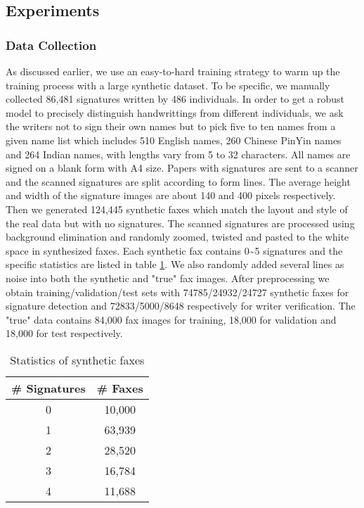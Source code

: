 \documentclass[sigconf]{acmart}
\begin{document}
\subsection{Experiments}

\subsubsection*{\rm \textbf{Data Collection}}
As discussed earlier, we use an easy-to-hard training strategy to warm up the training process with a large synthetic dataset. To be specific, we manually collected 86,481 signatures written by 486 individuals. In order to get a robust model to precisely distinguish handwrittings from different individuals, we ask the writers not to sign their own names but to pick five to ten names from a given name list which includes 510 English names, 260 Chinese PinYin names and 264 Indian names, with lengths vary from 5 to 32 characters. All names are signed on a blank form with A4 size. Papers with signatures are sent to a scanner and the scanned signatures are split according to form lines. The average height and width of the signature images are about 140 and 400 pixels respectively. Then we generated 124,445 synthetic faxes which match the layout and style of the real data but with no signatures. The scanned signatures are processed using background elimination and randomly zoomed, twisted and pasted to the white space in synthesized faxes. Each synthetic fax contains 0\textasciitilde5 signatures and the specific statistics are listed in table \ref{stat sig}. We also randomly added several lines as noise into both the synthetic and "true" fax images. After preprocessing we obtain training/validation/test sets with 74785/24932/24727 synthetic faxes for signature detection and 72833/5000/8648 respectively for writer verification. The "true" data contains 84,000 fax images for training, 18,000 for validation and 18,000 for test respectively.
\begin{table}
	\caption{Statistics of synthetic faxes}
	\label{stat sig}
	\centering
	\begin{tabular}{cc}
		\toprule
		\textbf{\# Signatures} & \textbf{\# Faxes}\\
		\midrule
		0 & 10,000 \\
		1 & 63,939 \\
		2 & 28,520 \\
		3 & 16,784 \\
		4 & 11,688 \\
		\bottomrule
	\end{tabular}
\end{table}
\end{document}
